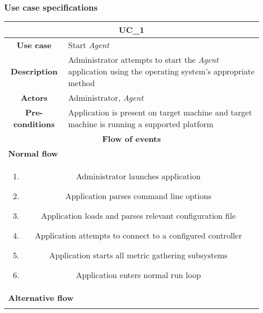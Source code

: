         \pagebreak

        \subsubsection{Use case specifications}
            \begin{longtable}{ |c|p{11.8cm}| }
                \hline
                \multicolumn{2}{|c|}{\cellcolor{lime} \textbf{UC\_1}}\\ \hline
                \cellcolor[gray]{0.9} \textbf{Use case} & Start \textit{Agent}\\ \hline
                \cellcolor[gray]{0.9} \textbf{Description} & Administrator attempts to start the \textit{Agent} application using the operating system's appropriate method\\ \hline
                \cellcolor[gray]{0.9} \textbf{Actors} & Administrator, \textit{Agent}\\ \hline
                \cellcolor[gray]{0.9} \textbf{Pre-conditions} & Application is present on target machine and target machine is running a supported platform\\ \hline
                \multicolumn{2}{|c|}{\cellcolor[gray]{0.9} \textbf{Flow of events}}\\ \hline
                \multicolumn{2}{|l|}{\cellcolor[gray]{0.9} \textbf{Normal flow}}\\ \hline
                \multicolumn{2}{|p{14cm}|}{
                    \begin{enumerate}
                        \item Administrator launches application
                        \item Application parses command line options
                        \item Application loads and parses relevant configuration file
                        \item Application attempts to connect to a configured controller
                        \item Application starts all metric gathering subsystems
                        \item Application enters normal run loop
                    \end{enumerate}
                }\\ \hline
                \multicolumn{2}{|l|}{\cellcolor[gray]{0.9} \textbf{Alternative flow}}\\ \hline
                \multicolumn{2}{|p{14cm}|}{
                    \begin{itemize}

\end{itemize}}
\end{longtable}
